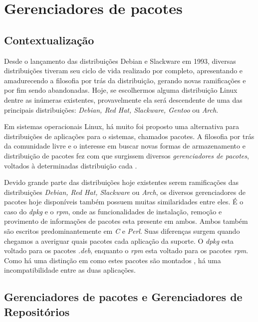 \section{Gerenciadores de pacotes} %
\label{sec:distribui_es_abordadas}

\subsection{Contextualização} %
\label{sec:breve_descri_o}

Desde o lançamento das distribuições Debian e Slackware em 1993, diversas distribuições tiveram seu ciclo de vida realizado por completo, apresentando e amadurecendo a filosofia por trás da distribuição, gerando novas ramificações e por fim sendo abandonadas. Hoje, se escolhermos alguma distribuição Linux dentre as inúmeras existentes, provavelmente ela será descendente de uma das principais distribuições: \textit{Debian, Red Hat, Slackware, Gentoo} ou \textit{Arch}.


Em sistemas operacionais Linux, há muito foi proposto uma alternativa para distribuições de aplicações para o sistemas, chamados pacotes. A filosofia por trás da comunidade livre \cite{bretthauer2001open} e o interesse em buscar novas formas de armazenamento e distribuição de pacotes fez com que surgissem diversos \textit{gerenciadores de pacotes}, voltados à determinadas distribuição  cada \cite{beck2002linux}.

Devido grande parte das distribuições hoje existentes serem ramificações das distribuições \textit{Debian, Red Hat, Slackware} ou \textit{Arch}, os diversos gerenciadores de pacotes hoje disponíveis também possuem muitas similaridades entre eles.
É o caso do \textit{dpkg} e o \textit{rpm}, onde as funcionalidades de instalação, remoção e provimento de informações de pacotes esta presente em ambos. Ambos também são escritos predominantemente em \textit{C} e \textit{Perl}. Suas diferenças surgem quando chegamos a averiguar quais pacotes cada aplicação da suporte. O \textit{dpkg} esta voltado para os pacotes \textit{.deb}, enquanto o \textit{rpm} esta voltado para os pacotes \textit{rpm}. Como há uma distinção em como estes pacotes são montados \cite{bailey1997maximum}, há uma incompatibilidade entre as duas aplicações. 


\subsection{Gerenciadores de pacotes e Gerenciadores de Repositórios} %
\label{sec:gerenciadores}


